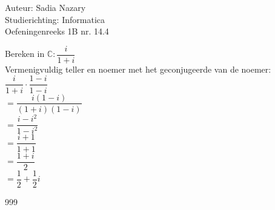 \documentclass[a4paper]{article}
\begin{document}
  
\noindent \large Auteur: Sadia Nazary  \\
\noindent \large Studierichting: Informatica\\
\noindent \large Oefeningenreeks 1B nr. 14.4\\

\medskip

\normalsize

Bereken in $\mathbb{C}: \dfrac{i}{1+i}$\\

Vermenigvuldig teller en noemer met het geconjugeerde van de noemer:\\

$\dfrac{i}{1+i} \cdot \dfrac{1-i}{1-i}$\\

$= \dfrac{i(1-i)}{(1+i)(1-i)}$\\

$= \dfrac{i - i^2}{1 - i^2}$\\

$= \dfrac{i + 1}{1 + 1}$\\

$= \dfrac{1+i}{2}$\\

$= \dfrac{1}{2} + \dfrac{1}{2}i$

\begin{thebibliography}{999}
\end{thebibliography}
\end{document}
